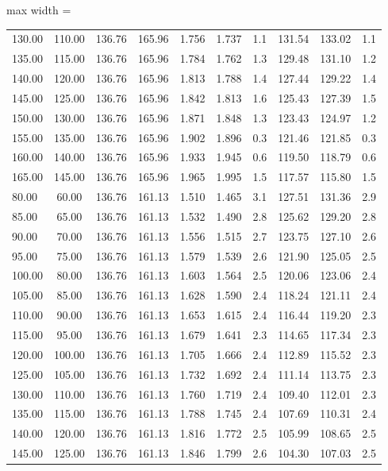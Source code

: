 \documentclass[english]{SPFShortReport}
\begin{document}
\begin{table}[!ht]
\begin{adjustbox}{max width =\textwidth}
\begin{tabular}{l | c c c c c c c c c }
130.00 & 110.00 & 136.76 & 165.96 & 1.756 & 1.737 & 1.1 & 131.54 & 133.02 & 1.1\\ 
135.00 & 115.00 & 136.76 & 165.96 & 1.784 & 1.762 & 1.3 & 129.48 & 131.10 & 1.2\\ 
140.00 & 120.00 & 136.76 & 165.96 & 1.813 & 1.788 & 1.4 & 127.44 & 129.22 & 1.4\\ 
145.00 & 125.00 & 136.76 & 165.96 & 1.842 & 1.813 & 1.6 & 125.43 & 127.39 & 1.5\\ 
150.00 & 130.00 & 136.76 & 165.96 & 1.871 & 1.848 & 1.3 & 123.43 & 124.97 & 1.2\\ 
155.00 & 135.00 & 136.76 & 165.96 & 1.902 & 1.896 & 0.3 & 121.46 & 121.85 & 0.3\\ 
160.00 & 140.00 & 136.76 & 165.96 & 1.933 & 1.945 & 0.6 & 119.50 & 118.79 & 0.6\\ 
165.00 & 145.00 & 136.76 & 165.96 & 1.965 & 1.995 & 1.5 & 117.57 & 115.80 & 1.5\\ 
80.00 & 60.00 & 136.76 & 161.13 & 1.510 & 1.465 & 3.1 & 127.51 & 131.36 & 2.9\\ 
85.00 & 65.00 & 136.76 & 161.13 & 1.532 & 1.490 & 2.8 & 125.62 & 129.20 & 2.8\\ 
90.00 & 70.00 & 136.76 & 161.13 & 1.556 & 1.515 & 2.7 & 123.75 & 127.10 & 2.6\\ 
95.00 & 75.00 & 136.76 & 161.13 & 1.579 & 1.539 & 2.6 & 121.90 & 125.05 & 2.5\\ 
100.00 & 80.00 & 136.76 & 161.13 & 1.603 & 1.564 & 2.5 & 120.06 & 123.06 & 2.4\\ 
105.00 & 85.00 & 136.76 & 161.13 & 1.628 & 1.590 & 2.4 & 118.24 & 121.11 & 2.4\\ 
110.00 & 90.00 & 136.76 & 161.13 & 1.653 & 1.615 & 2.4 & 116.44 & 119.20 & 2.3\\ 
115.00 & 95.00 & 136.76 & 161.13 & 1.679 & 1.641 & 2.3 & 114.65 & 117.34 & 2.3\\ 
120.00 & 100.00 & 136.76 & 161.13 & 1.705 & 1.666 & 2.4 & 112.89 & 115.52 & 2.3\\ 
125.00 & 105.00 & 136.76 & 161.13 & 1.732 & 1.692 & 2.4 & 111.14 & 113.75 & 2.3\\ 
130.00 & 110.00 & 136.76 & 161.13 & 1.760 & 1.719 & 2.4 & 109.40 & 112.01 & 2.3\\ 
135.00 & 115.00 & 136.76 & 161.13 & 1.788 & 1.745 & 2.4 & 107.69 & 110.31 & 2.4\\ 
140.00 & 120.00 & 136.76 & 161.13 & 1.816 & 1.772 & 2.5 & 105.99 & 108.65 & 2.5\\ 
145.00 & 125.00 & 136.76 & 161.13 & 1.846 & 1.799 & 2.6 & 104.30 & 107.03 & 2.5\\ 

\end{tabular}
\end{adjustbox}
\end{table}
\end{document}
